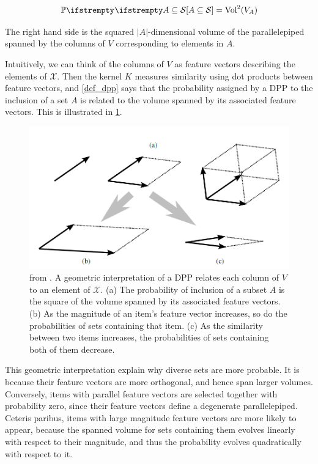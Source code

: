 \begin{equation}
    \PP{}{A \subseteq \mathcal{S}} = \operatorname{Vol}^2(V_A)
\end{equation}

The right hand side is the squared $|A|$-dimensional volume of the parallelepiped spanned by the columns of $V$ corresponding to elements in $A$.

Intuitively, we can think of the columns of $V$ as feature vectors describing the elements
of $\mathcal{X}$. Then the kernel $K$ measures similarity using dot products between feature vectors, and \cref{def_dpp} says that the probability assigned by a DPP to the inclusion of a set $A$ is related to the volume spanned by its associated feature vectors. This is illustrated in \cref{fig_geometric_interpret}.

\begin{figure}[!ht]
    \centering
    \includegraphics[width=0.8\linewidth]{pics/geometric_interpret.png}
    \caption{from \cite{kulesza2012_dpp_for_ml}. A geometric interpretation of a DPP relates each column of $V$ to an element of $\mathcal{X}$. (a) The  probability of inclusion of a subset $A$ is the square of the volume spanned by its associated feature vectors. (b) As the magnitude of an item's feature vector increases, so do the probabilities of sets containing that item. (c) As the similarity between two items increases, the probabilities of sets containing both of them decrease.}
    \label{fig_geometric_interpret}
\end{figure}

This geometric interpretation explain why diverse sets are more probable. It is because their feature vectors are more orthogonal, and hence span larger volumes. Conversely, items with parallel feature vectors are selected together with probability zero, since their feature vectors define a degenerate parallelepiped. Ceteris paribus, items with large magnitude feature vectors are more likely to appear, because the spanned volume for sets containing them evolves linearly with respect to their magnitude, and thus the probability evolves quadratically with respect to it.









